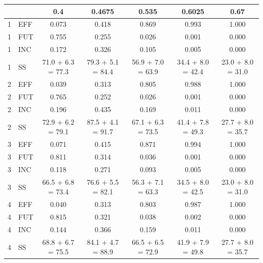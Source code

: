 \documentclass[12pt]{article}
\begin{document}
\begin{center}
\begin{tabular}{ll|ccccc}
&&0.4&0.4675&0.535&0.6025&0.67\\
\hline
1&EFF&0.073&0.418&0.869&0.993&1.000\\
1&FUT&0.755&0.255&0.026&0.001&0.000\\
1&INC&0.172&0.326&0.105&0.005&0.000\\
1&SS&71.0 + 6.3 = 77.3&79.3 + 5.1 = 84.4&56.9 + 7.0 = 63.9&34.4 + 8.0 = 42.4&23.0 + 8.0 = 31.0\\
\hline
2&EFF&0.039&0.313&0.805&0.988&1.000\\
2&FUT&0.765&0.252&0.026&0.001&0.000\\
2&INC&0.196&0.435&0.169&0.011&0.000\\
2&SS&72.9 + 6.2 = 79.1&87.5 + 4.1 = 91.7&67.1 + 6.3 = 73.5&41.4 + 7.8 = 49.3&27.7 + 8.0 = 35.7\\
\hline
3&EFF&0.071&0.415&0.871&0.994&1.000\\
3&FUT&0.811&0.314&0.036&0.001&0.000\\
3&INC&0.118&0.271&0.093&0.005&0.000\\
3&SS&66.5 + 6.8 = 73.4&76.6 + 5.5 = 82.1&56.3 + 7.1 = 63.3&34.5 + 8.0 = 42.5&23.0 + 8.0 = 31.0\\
\hline
4&EFF&0.040&0.313&0.803&0.987&1.000\\
4&FUT&0.815&0.321&0.038&0.002&0.000\\
4&INC&0.144&0.366&0.159&0.011&0.000\\
4&SS&68.8 + 6.7 = 75.5&84.1 + 4.7 = 88.9&66.5 + 6.5 = 72.9&41.9 + 7.9 = 49.8&27.7 + 8.0 = 35.7\\

\end{tabular}
\end{center}
\end{document}
